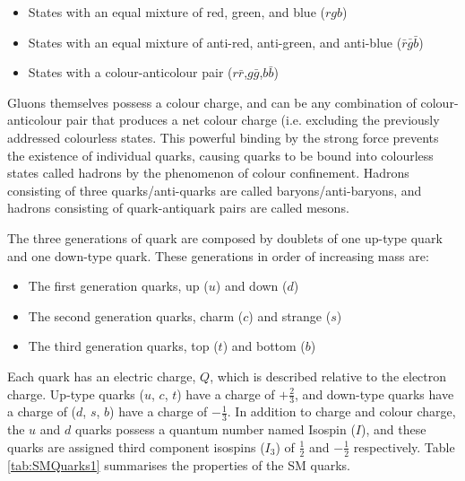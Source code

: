 \documentclass[12pt,a4paper,epsf,portrait,times,epsfig]{report}
\begin{document}
	\begin{itemize}
		\item States with an equal mixture of red, green, and blue ($rgb$)
		\item States with an equal mixture of anti-red, anti-green, and anti-blue ($\bar{r}\bar{g}\bar{b}$)
		\item States with a colour-anticolour pair ($r\bar{r}$,$g\bar{g}$,$b\bar{b}$)
	\end{itemize}

	Gluons themselves possess a colour charge, and can be any combination of colour-anticolour pair that produces a net colour charge (i.e. excluding the previously addressed colourless states. This powerful binding by the strong force prevents the existence of individual quarks, causing quarks to be bound into colourless states called hadrons by the phenomenon of colour confinement. Hadrons consisting of three quarks/anti-quarks are called baryons/anti-baryons, and hadrons consisting of quark-antiquark pairs are called mesons. \par

	The three generations of quark are composed by doublets of one up-type quark and one down-type quark. These generations in order of increasing mass are:
	
	\begin{itemize}
		\item The first generation quarks, up ($u$) and down ($d$)
		\item The second generation quarks, charm ($c$) and strange ($s$)
		\item The third generation quarks, top ($t$) and bottom ($b$)
	\end{itemize}
	
	Each quark has an electric charge, $Q$, which is described relative to the electron charge. Up-type quarks ($u$, $c$, $t$) have a charge of $+\frac{2}{3}$, and down-type quarks have a charge of ($d$, $s$, $b$) have a charge of $-\frac{1}{3}$. In addition to charge and colour charge, the $u$ and $d$ quarks possess a quantum number named Isospin ($I$), and these quarks are assigned third component isospins ($I_{3}$) of $\frac{1}{2}$ and $-\frac{1}{2}$ respectively. Table \ref{tab:SMQuarks1} summarises the properties of the SM quarks.

\end{document}
